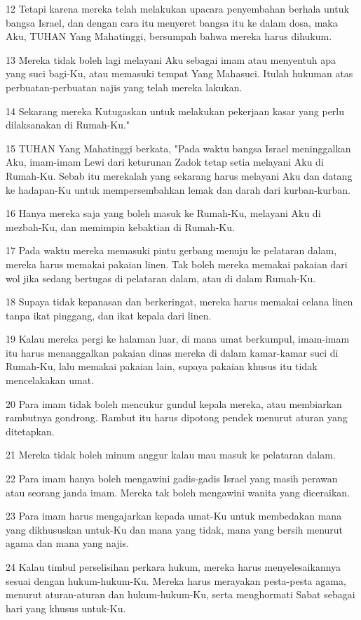 \par 12 Tetapi karena mereka telah melakukan upacara penyembahan berhala untuk bangsa Israel, dan dengan cara itu menyeret bangsa itu ke dalam dosa, maka Aku, TUHAN Yang Mahatinggi, bersumpah bahwa mereka harus dihukum.
\par 13 Mereka tidak boleh lagi melayani Aku sebagai imam atau menyentuh apa yang suci bagi-Ku, atau memasuki tempat Yang Mahasuci. Itulah hukuman atas perbuatan-perbuatan najis yang telah mereka lakukan.
\par 14 Sekarang mereka Kutugaskan untuk melakukan pekerjaan kasar yang perlu dilaksanakan di Rumah-Ku."
\par 15 TUHAN Yang Mahatinggi berkata, "Pada waktu bangsa Israel meninggalkan Aku, imam-imam Lewi dari keturunan Zadok tetap setia melayani Aku di Rumah-Ku. Sebab itu merekalah yang sekarang harus melayani Aku dan datang ke hadapan-Ku untuk mempersembahkan lemak dan darah dari kurban-kurban.
\par 16 Hanya mereka saja yang boleh masuk ke Rumah-Ku, melayani Aku di mezbah-Ku, dan memimpin kebaktian di Rumah-Ku.
\par 17 Pada waktu mereka memasuki pintu gerbang menuju ke pelataran dalam, mereka harus memakai pakaian linen. Tak boleh mereka memakai pakaian dari wol jika sedang bertugas di pelataran dalam, atau di dalam Rumah-Ku.
\par 18 Supaya tidak kepanasan dan berkeringat, mereka harus memakai celana linen tanpa ikat pinggang, dan ikat kepala dari linen.
\par 19 Kalau mereka pergi ke halaman luar, di mana umat berkumpul, imam-imam itu harus menanggalkan pakaian dinas mereka di dalam kamar-kamar suci di Rumah-Ku, lalu memakai pakaian lain, supaya pakaian khusus itu tidak mencelakakan umat.
\par 20 Para imam tidak boleh mencukur gundul kepala mereka, atau membiarkan rambutnya gondrong. Rambut itu harus dipotong pendek menurut aturan yang ditetapkan.
\par 21 Mereka tidak boleh minum anggur kalau mau masuk ke pelataran dalam.
\par 22 Para imam hanya boleh mengawini gadis-gadis Israel yang masih perawan atau seorang janda imam. Mereka tak boleh mengawini wanita yang diceraikan.
\par 23 Para imam harus mengajarkan kepada umat-Ku untuk membedakan mana yang dikhususkan untuk-Ku dan mana yang tidak, mana yang bersih menurut agama dan mana yang najis.
\par 24 Kalau timbul perselisihan perkara hukum, mereka harus menyelesaikannya sesuai dengan hukum-hukum-Ku. Mereka harus merayakan pesta-pesta agama, menurut aturan-aturan dan hukum-hukum-Ku, serta menghormati Sabat sebagai hari yang khusus untuk-Ku.
